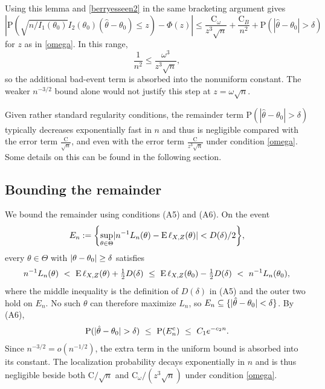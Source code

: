 Using this lemma and \eqref{berryesseen2} in the same bracketing argument gives
\begin{equation}
	|\displaystyle \mathrm{P}(\sqrt{n/I_1(\theta_{0})}I_2(\theta_0)(\hat{\theta}-\theta_{0})\leq z)-\Phi(z)|\leq\frac{\mathrm{C}_{\omega}}{z^{3}\sqrt{n}}+\frac{\mathrm{C}_{B}}{n^{2}}+\mathrm{P}(|\hat{\theta}-\theta_{0}|>\delta)
\end{equation}
for $z$ as in \eqref{omega}. In this range,
\[
\frac{1}{n^2}\leq\frac{\omega^3}{z^3\sqrt{n}},
\]
so the additional bad-event term is absorbed into the nonuniform constant. The weaker $n^{-3/2}$ bound alone would not justify this step at $z=\omega\sqrt n$.

Given rather standard regularity conditions, the remainder term $\mathrm{P}(|\hat{\theta}-\theta_{0}|>\delta)$ typically decreases exponentially fast in $n$ and thus is negligible compared with the error term $\displaystyle \frac{\mathrm{C}}{\sqrt{n}}$, and even with the error term $\displaystyle \frac{\mathrm{C}}{z^{3}\sqrt{n}}$ under condition \eqref{omega}. Some details on this can be found in the following section.

\subsection{Bounding the remainder}
\label{sec:remainder}

We bound the remainder using conditions (A5) and (A6). On the event
$$
E_n:=\set*{\sup_{\theta\in\Theta}\abs{n^{-1}L_n(\theta)-\E\,\ell_{X,Z}(\theta)}<D(\delta)/2},
$$
every $\theta\in\Theta$ with $\lvert\theta-\theta_0\rvert\ge\delta$ satisfies
$$
n^{-1}L_n(\theta)\ <\ \E\,\ell_{X,Z}(\theta)+\tfrac{1}{2}D(\delta)
\ \le\ \E\,\ell_{X,Z}(\theta_0)-\tfrac{1}{2}D(\delta)
\ <\ n^{-1}L_n(\theta_0),
$$
where the middle inequality is the definition of $D(\delta)$ in (A5) and the outer two hold on $E_n$. No such $\theta$ can therefore maximize $L_n$, so $E_n\subseteq\{\lvert\hat\theta-\theta_0\rvert<\delta\}$. By (A6),
\begin{equation}\label{eq:exp-decay}
	\mathrm{P}(\abs{\hat{\theta}-\theta_{0}}>\delta)\ \leq\ \Prob(E_n^{\mathrm{c}})\ \leq\ C_1 e^{-c_2 n}.
\end{equation}
Since $n^{-3/2}=o(n^{-1/2})$, the extra term in the uniform bound is absorbed into its constant. The localization probability decays exponentially in $n$ and is thus negligible beside both $\mathrm{C}/\sqrt{n}$ and $\mathrm{C}_\omega/(z^{3}\sqrt{n})$ under condition \eqref{omega}.

